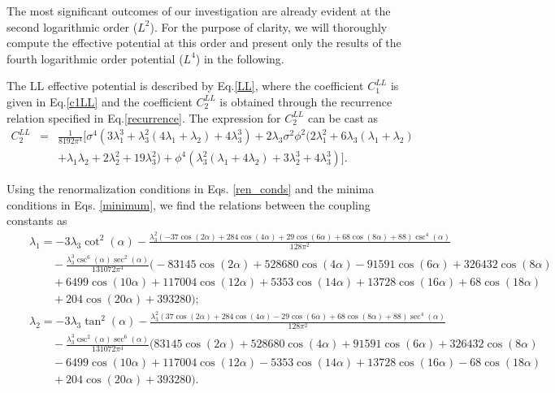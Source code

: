 \documentclass[11pt,a4paper,english,superscriptaddress,preprint,aps,prd]{revtex4}
\begin{document}
The most significant outcomes of our investigation are already evident at the second logarithmic order ($L^2$). For the purpose of clarity, we will thoroughly compute the effective potential at this order and present only the results of the fourth logarithmic order potential ($L^4$) in the following. 

The LL effective potential is described by Eq.\eqref{LL}, where the coefficient $C_1^{LL}$ is given in Eq.\eqref{c1LL} and the coefficient $C_2^{LL}$ is obtained through the recurrence relation specified in Eq.\eqref{recurrence}. The expression for $C_2^{LL}$ can be cast as
\begin{eqnarray}
 C_2^{LL} &=& \frac{1}{8192 \pi ^4}\Bigr[\sigma ^4 \left(3 \lambda_1^3+\lambda_3^2 (4 \lambda_1+\lambda_2)+4 \lambda_3^3\right)+2 \lambda_3 \sigma ^2 \phi ^2 (2 \lambda_1^2+6 \lambda_3 (\lambda_1+\lambda_2)\nonumber\\
  &&+\lambda_1 \lambda_2+2 \lambda_2^2+19 \lambda_3^2)+\phi ^4 \left(\lambda_3^2 (\lambda_1+4 \lambda_2)+3 \lambda_2^3+4 \lambda_3^3\right)\Bigr].
\end{eqnarray}

Using the renormalization conditions in Eqs. \eqref{ren_conds} and the minima conditions in Eqs. \eqref{minimum}, we find the relations between the coupling constants as
\begin{subequations}\label{2loops_relations}
 \begin{eqnarray}
  &&\lambda_1 = -3 \lambda_3 \cot ^2(\alpha )-\frac{\lambda_3^2 (-37 \cos (2 \alpha )+284 \cos (4 \alpha )+29 \cos (6 \alpha )+68 \cos (8 \alpha )+88) \csc ^4(\alpha )}{128 \pi ^2}\nonumber\\
  &&\qquad -\frac{\lambda_3^3\csc ^6(\alpha ) \sec ^2(\alpha )}{131072 \pi ^4}\Bigr(-83145 \cos (2 \alpha )+528680 \cos (4 \alpha )-91591 \cos (6 \alpha )+326432 \cos (8 \alpha )\nonumber\\
  &&\qquad+6499 \cos (10 \alpha )+117004 \cos (12 \alpha )+5353 \cos (14 \alpha )+13728 \cos (16 \alpha )+68 \cos (18 \alpha )\nonumber\\
  &&\qquad+204 \cos (20 \alpha )+393280\Bigr);\\
  &&\lambda_2 = -3 \lambda_3 \tan ^2(\alpha ) -\frac{\lambda_3^2 (37 \cos (2 \alpha )+284 \cos (4 \alpha )-29 \cos (6 \alpha )+68 \cos (8 \alpha )+88) \sec ^4(\alpha )}{128 \pi ^2} \nonumber\\
  &&\qquad -\frac{\lambda_3^3\csc ^2(\alpha ) \sec ^6(\alpha )}{131072 \pi ^4}\Bigr(83145 \cos (2 \alpha )+528680 \cos (4 \alpha )+91591 \cos (6 \alpha )+326432 \cos (8 \alpha )\nonumber\\
  &&\qquad-6499 \cos (10 \alpha )+117004 \cos (12 \alpha )-5353 \cos (14 \alpha )+13728 \cos (16 \alpha )-68 \cos (18 \alpha )\nonumber\\
  &&\qquad+204 \cos (20 \alpha )+393280\Bigr).
 \end{eqnarray}
\end{subequations}
\end{document}
